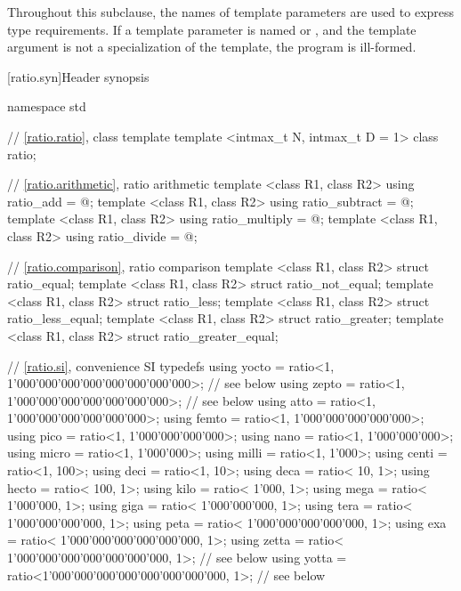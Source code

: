 \pnum
Throughout this subclause, the names of template parameters are used to express
type requirements. If a template parameter is named  or ,
and the template argument is not a specialization of the  template,
the program is ill-formed.

%
[ratio.syn]{Header  synopsis}

\begin{codeblockdigitsep}
namespace std {
  // \ref{ratio.ratio}, class template 
  template <intmax_t N, intmax_t D = 1> class ratio;

  // \ref{ratio.arithmetic}, ratio arithmetic
  template <class R1, class R2> using ratio_add = @\seebelow@;
  template <class R1, class R2> using ratio_subtract = @\seebelow@;
  template <class R1, class R2> using ratio_multiply = @\seebelow@;
  template <class R1, class R2> using ratio_divide = @\seebelow@;

  // \ref{ratio.comparison}, ratio comparison
  template <class R1, class R2> struct ratio_equal;
  template <class R1, class R2> struct ratio_not_equal;
  template <class R1, class R2> struct ratio_less;
  template <class R1, class R2> struct ratio_less_equal;
  template <class R1, class R2> struct ratio_greater;
  template <class R1, class R2> struct ratio_greater_equal;

  // \ref{ratio.si}, convenience SI typedefs
  using yocto = ratio<1, 1'000'000'000'000'000'000'000'000>;  // see below
  using zepto = ratio<1,     1'000'000'000'000'000'000'000>;  // see below
  using atto  = ratio<1,         1'000'000'000'000'000'000>;
  using femto = ratio<1,             1'000'000'000'000'000>;
  using pico  = ratio<1,                 1'000'000'000'000>;
  using nano  = ratio<1,                     1'000'000'000>;
  using micro = ratio<1,                         1'000'000>;
  using milli = ratio<1,                             1'000>;
  using centi = ratio<1,                               100>;
  using deci  = ratio<1,                                10>;
  using deca  = ratio<                               10, 1>;
  using hecto = ratio<                              100, 1>;
  using kilo  = ratio<                            1'000, 1>;
  using mega  = ratio<                        1'000'000, 1>;
  using giga  = ratio<                    1'000'000'000, 1>;
  using tera  = ratio<                1'000'000'000'000, 1>;
  using peta  = ratio<            1'000'000'000'000'000, 1>;
  using exa   = ratio<        1'000'000'000'000'000'000, 1>;
  using zetta = ratio<    1'000'000'000'000'000'000'000, 1>;  // see below
  using yotta = ratio<1'000'000'000'000'000'000'000'000, 1>;  // see below

}
\end{codeblockdigitsep}
